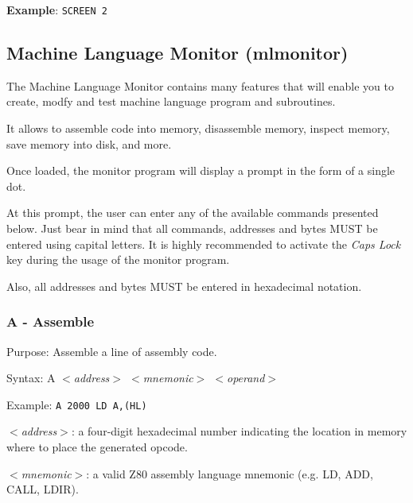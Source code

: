         \textbf{Example}: \texttt{SCREEN 2}

    \subsection{Machine Language Monitor (mlmonitor)}
    \label{software:mlmonitor}

    The Machine Language Monitor contains many features that will enable you to
    create, modfy and test machine language program and subroutines.

    It allows to assemble code into memory, disassemble memory, inspect memory,
    save memory into disk, and more.

    Once loaded, the monitor program will display a prompt in the form of a
    single dot.

    At this prompt, the user can enter any of the available commands presented
    below. Just bear in mind that all commands, addresses and bytes MUST be
    entered using capital letters. It is highly recommended to activate the
    \textit{Caps Lock} key during the usage of the monitor program.

    Also, all addresses and bytes MUST be entered in hexadecimal notation.

        \subsubsection{A - Assemble}

        Purpose: Assemble a line of assembly code.

        Syntax: A \textit{$<$address$>$ $<$mnemonic$>$ $<$operand$>$}

        Example: \texttt{A 2000 LD A,(HL)}

        \hspace{1cm}\textit{$<$address$>$}: a four-digit hexadecimal number indicating
        the location in memory where to place the generated opcode.

        \hspace{1cm}\textit{$<$mnemonic$>$}: a valid Z80 assembly language
        mnemonic (e.g. LD, ADD, CALL, LDIR).

